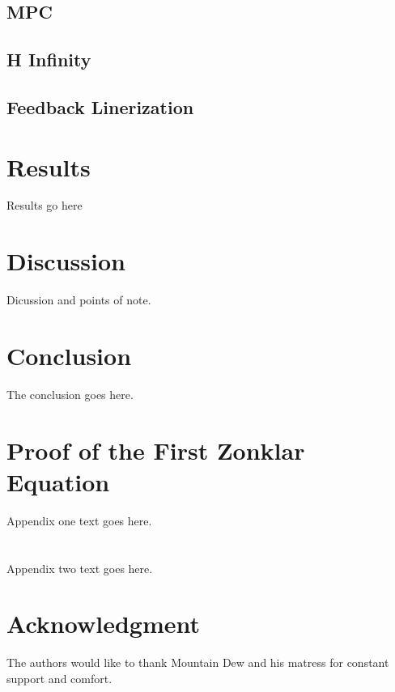 \documentclass[journal]{IEEEtran}
\begin{document}
 \subsection{MPC}

 \subsection{H Infinity}

 \subsection{Feedback Linerization}

 \section{Results}

Results go here

\section{Discussion}

Dicussion and points of note.


\section{Conclusion}
The conclusion goes here.


\appendices
\section{Proof of the First Zonklar Equation}
Appendix one text goes here.


\section{}
Appendix two text goes here.


\section*{Acknowledgment}


The authors would like to thank Mountain Dew and his matress for constant support and comfort.



\ifCLASSOPTIONcaptionsoff
  \newpage
\fi
\end{document}
